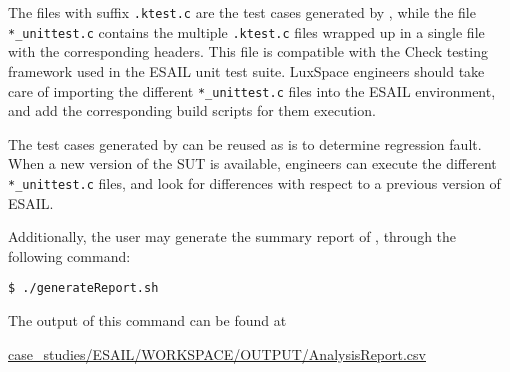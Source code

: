 The files with suffix \texttt{.ktest.c}  are the test cases generated by \SEMUS, while the file \texttt{*\_unittest.c} contains the multiple \texttt{.ktest.c} files wrapped up in a single file with the corresponding headers. This file is compatible with the Check testing framework used in the ESAIL unit test suite. LuxSpace engineers should take care of importing the different \texttt{*\_unittest.c} files into the ESAIL environment, and add the corresponding build scripts for them execution.

The test cases generated by \SEMUS can be reused as is to determine regression fault. When a new version of the SUT is available, engineers can execute the different \texttt{*\_unittest.c} files, and look for differences with respect to a previous version of ESAIL.

Additionally, the user may generate the summary report of \SEMUS, through the following command:

\begin{lstlisting}[language={}, label=listing:semus_results]
 $ ./generateReport.sh
\end{lstlisting}

The output of this command can be found at \begin{scriptsize}\url{case_studies/ESAIL/WORKSPACE/OUTPUT/AnalysisReport.csv}\end{scriptsize}
